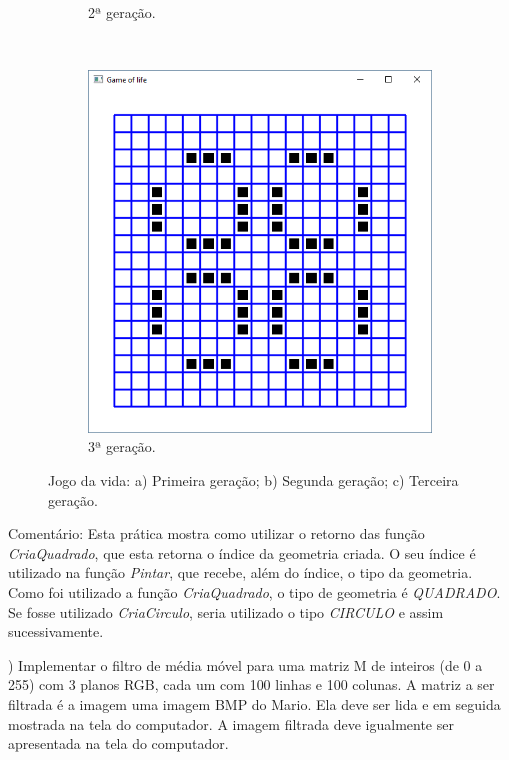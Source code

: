 \begin{renumerate}
\begin{figure}[H]
\begin{subfigure}[t]{0.27\textwidth}
        \caption{2ª geração.}
        \label{fig:cap03_ex9a}
    \end{subfigure}
    ~
    \begin{subfigure}[t]{0.27\textwidth}
        \centerline{\includegraphics[width=.9\textwidth]{img/cap2_ex9c.png}}
        \caption{3ª geração.}
        \label{fig:cap03_ex9a}
    \end{subfigure}
    \caption{Jogo da vida: a) Primeira geração; b) Segunda geração; c) Terceira geração.}
  \end{figure}

  Comentário: Esta prática mostra como utilizar o retorno das função \emph{CriaQuadrado}, que esta retorna o índice da geometria criada. O seu índice é utilizado na função \emph{Pintar}, que recebe, além do índice, o tipo da geometria. Como foi utilizado a função \emph{CriaQuadrado}, o tipo de geometria é \emph{QUADRADO}. Se fosse utilizado \emph{CriaCirculo}, seria utilizado o tipo \emph{CIRCULO} e assim sucessivamente.
%

  \item)
  Implementar o filtro de média móvel para uma matriz M de inteiros (de 0 a 255) com 3 planos RGB, cada um com 100 linhas e 100 colunas.
A matriz a ser filtrada é a imagem uma imagem BMP do Mario. Ela deve ser lida e em seguida mostrada na tela do computador. A imagem filtrada deve igualmente ser apresentada na tela do computador.
  \label{ex:cap02_ex27}


\end{renumerate}
